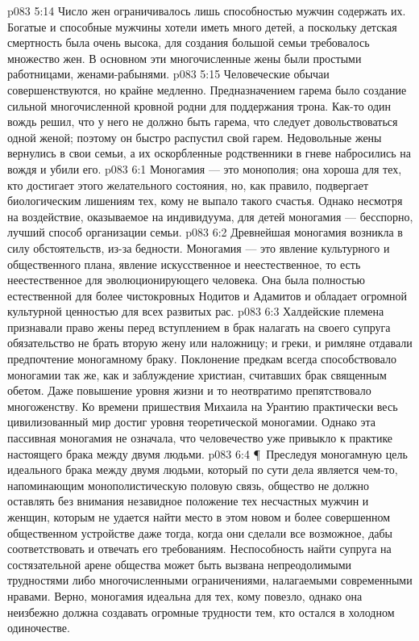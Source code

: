 \vs p083 5:14 Число жен ограничивалось лишь способностью мужчин содержать их. Богатые и способные мужчины хотели иметь много детей, а поскольку детская смертность была очень высока, для создания большой семьи требовалось множество жен. В основном эти многочисленные жены были простыми работницами, женами\hyp{}рабынями.
\vs p083 5:15 Человеческие обычаи совершенствуются, но крайне медленно. Предназначением гарема было создание сильной многочисленной кровной родни для поддержания трона. Как\hyp{}то один вождь решил, что у него не должно быть гарема, что следует довольствоваться одной женой; поэтому он быстро распустил свой гарем. Недовольные жены вернулись в свои семьи, а их оскорбленные родственники в гневе набросились на вождя и убили его.
\vs p083 6:1 Моногамия --- это монополия; она хороша для тех, кто достигает этого желательного состояния, но, как правило, подвергает биологическим лишениям тех, кому не выпало такого счастья. Однако несмотря на воздействие, оказываемое на индивидуума, для детей моногамия --- бесспорно, лучший способ организации семьи.
\vs p083 6:2 Древнейшая моногамия возникла в силу обстоятельств, из\hyp{}за бедности. Моногамия --- это явление культурного и общественного плана, явление искусственное и неестественное, то есть неестественное для эволюционирующего человека. Она была полностью естественной для более чистокровных Нодитов и Адамитов и обладает огромной культурной ценностью для всех развитых рас.
\vs p083 6:3 Халдейские племена признавали право жены перед вступлением в брак налагать на своего супруга обязательство не брать вторую жену или наложницу; и греки, и римляне отдавали предпочтение моногамному браку. Поклонение предкам всегда способствовало моногамии так же, как и заблуждение христиан, считавших брак священным обетом. Даже повышение уровня жизни и то неотвратимо препятствовало многоженству. Ко времени пришествия Михаила на Урантию практически весь цивилизованный мир достиг уровня теоретической моногамии. Однако эта пассивная моногамия не означала, что человечество уже привыкло к практике настоящего брака между двумя людьми.
\vs p083 6:4 \P\ Преследуя моногамную цель идеального брака между двумя людьми, который по сути дела является чем\hyp{}то, напоминающим монополистическую половую связь, общество не должно оставлять без внимания незавидное положение тех несчастных мужчин и женщин, которым не удается найти место в этом новом и более совершенном общественном устройстве даже тогда, когда они сделали все возможное, дабы соответствовать и отвечать его требованиям. Неспособность найти супруга на состязательной арене общества может быть вызвана непреодолимыми трудностями либо многочисленными ограничениями, налагаемыми современными нравами. Верно, моногамия идеальна для тех, кому повезло, однако она неизбежно должна создавать огромные трудности тем, кто остался в холодном одиночестве.
